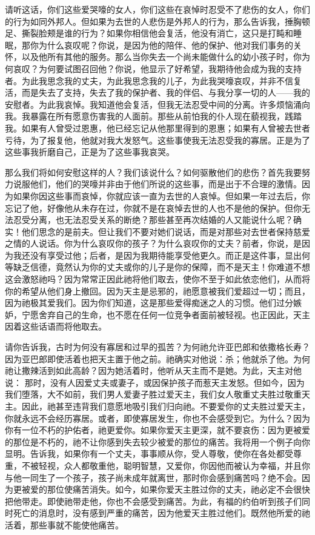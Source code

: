 请听这话，你们这些爱哭嚎的女人，你们这些在哀悼时忍受不了悲伤的女人，你们的行为如同外邦人。但如果为去世的人悲伤是外邦人的行为，那么告诉我，捶胸顿足、撕裂脸颊是谁的行为？如果你相信他会复活，他没有消亡，这只是打盹和睡眠，那你为什么哀叹呢？你说，是因为他的陪伴、他的保护、他对我们事务的关怀，以及他所有其他的服务。那么当你失去一个尚未能做什么的幼小孩子时，你为何哀叹？为何要试图召回他？你说，他显示了好希望，我期待他会成为我的支持者。为此我思念我的丈夫，为此我思念我的儿子，为此我哭嚎哀叹，并非不信复活，而是失去了支持，失去了我的保护者、我的伴侣、与我分享一切的人——我的安慰者。为此我哀悼。我知道他会复活，但我无法忍受中间的分离。许多烦恼涌向我。我暴露在所有愿意伤害我的人面前。那些从前怕我的仆人现在藐视我，践踏我。如果有人曾受过恩惠，他已经忘记从他那里得到的恩惠；如果有人曾被去世者亏待，为了报复他，他就对我大发怒气。这些事使我无法忍受我的寡居。正是为了这些事我折磨自己，正是为了这些事我哀哭。\par

那么我们将如何安慰这样的人？我们该说什么？如何驱散他们的悲伤？首先我要努力说服他们，他们的哭嚎并非由于他们所说的这些事，而是出于不合理的激情。因为如果你因这些事而哀悼，你就应该一直为去世的人哀悼。但如果一年过去后，你忘记了他，好像他从未存在过，你就不是在哀悼去世的人也不是他的保护。但你无法忍受分离，也无法忍受关系的断绝？那些甚至再次结婚的人又能说什么呢？确实！他们思念的是前夫。但让我们不要对她们说话，而是对那些对去世者保持慈爱之情的人说话。你为什么哀叹你的孩子？为什么哀叹你的丈夫？前者，你说，是因为我还没有享受过他；后者，是因为我期待能享受他更久。而正是这件事，显出何等缺乏信德，竟然认为你的丈夫或你的儿子是你的保障，而不是天主！你难道不想这会激怒祂吗？因为常常正因此祂将他们取去，使你不至于如此依恋他们，从而将你的希望从他们身上撤回。因为天主是忌邪的，祂愿意被我们爱超过一切；而且，因为祂极其爱我们。因为你们知道，这是那些爱得痴迷之人的习惯。他们过分嫉妒，宁愿舍弃自己的生命，也不愿在任何一位竞争者面前被轻视。也正因此，天主因着这些话语而将他取去。\par

请你告诉我，古时为何没有寡居和过早的孤苦？为何祂允许亚巴郎和依撒格长寿？因为亚巴郎即使活着也把天主置于他之前。祂确实对他说：杀；他就杀了他。为何祂让撒辣活到如此高龄？因为她活着时，他听从天主而不是她。为此，天主对他说： 那时，没有人因爱丈夫或妻子，或因保护孩子而惹天主发怒。但如今，因为我们堕落，大不如前，我们男人爱妻子胜过爱天主，我们女人敬重丈夫胜过敬重天主。因此，祂甚至违背我们意愿地吸引我们归向祂。不要爱你的丈夫胜过爱天主，你就永远不会经历寡居。或者，即使寡居发生，你也不会感受到它。为什么？因为你有一位不朽的护佑者，祂更爱你。如果你爱天主更深，就不要哀伤：因为更被爱的那位是不朽的，祂不让你感到失去较少被爱的那位的痛苦。我将用一个例子向你显明。告诉我，如果你有一个丈夫，事事顺从你，受人尊敬，使你在各处都受尊重，不被轻视，众人都敬重他，聪明智慧，又爱你，你因他而被认为幸福，并且你与他一同生了一个孩子，孩子尚未成年就离世，那时你会感到痛苦吗？绝不会。因为更被爱的那位使痛苦消失。如今，如果你爱天主胜过你的丈夫，祂必定不会很快把他带走。即使祂带走他，你也不会感受到痛苦。为此，有福的约伯听到孩子们同时死亡的消息时，没有感到严重的痛苦，因为他爱天主胜过他们。既然他所爱的祂活着，那些事就不能使他痛苦。\par


